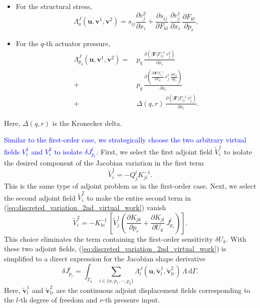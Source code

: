 \documentclass[journal]{IEEEtran}
\theoremstyle{definition}
\begin{document}
\begin{itemize}
  \item For the structural stress,
    \begin{equation}
      \Lambda^J_a\left(\mathbf{u},\mathbf{v}^1,\mathbf{v}^2\right) = s_{ij}\frac{\partial v^2_j}{\partial x_i} + \frac{\partial s_{ij}}{\partial F_{kl}}\,\frac{\partial v^1_j}{\partial x_i}\,\frac{\partial F_{kl}}{\partial p_r},
    \end{equation}
  \item For the $q$-th actuator pressure,
    \begin{equation}
      \begin{split}
        \Lambda^J_{p_q}\left(\mathbf{u},\mathbf{v}^1,\mathbf{v}^2\right) =\,
        &p_q\,\frac{\partial\left(\left|\mathbf{F}\right|F^{-1}_{ij}\,v^2_j\right)}{\partial x_i} \\
        +&p_q\,\frac{\partial\left(\frac{\partial\left|\mathbf{F}\right|F^{-1}_{ij}}{\partial F_{kl}}\,v^1_j\,\frac{\partial F_{kl}}{\partial p_r}\right)}{\partial x_i}\\[1mm]
        +&\Delta\left(q,r\right)\,\frac{\partial\left( \left|\mathbf{F}\right|F^{-1}_{ij}\,v^1_j\right)}{\partial x_i}.
      \end{split}
    \end{equation}
\end{itemize}
Here, $\Delta(q,r)$ is the Kronecker delta.

\textcolor{blue}{Similar to the first-order case, we strategically choose the two arbitrary virtual fields $V_i^1$ and $V_i^2$ to isolate $\delta J^l_{p_r}$.}
First, we select the first adjoint field $\tilde{V}_i^1$ to isolate the desired component of the Jacobian variation in the first term
\begin{equation}
  \tilde{V}_i^1 = -Q^l_j K^{-1}_{ji} .
  \label{eq:first_adjoint}
\end{equation}
This is the same type of adjoint problem as in the first-order case.
Next, we select the second adjoint field $\tilde{V}_i^2$ to make the entire second term in (\ref{eq:discreted_variation_2nd_virtual_work}) vanish
\begin{equation}
  \tilde{V}_i^2 = -K_{ki}^{-1}\,\left[ \tilde{V}_j^1\left(\frac{\partial K_{jk}}{\partial {p_r}} + \frac{\partial K_{jl}}{\partial U_k}\,J^l_{p_r}\right) \right].
  \label{eq:second_adjoint}
\end{equation}
This choice eliminates the term containing the first-order sensitivity $\delta U_k$. With these two adjoint fields, (\ref{eq:discreted_variation_2nd_virtual_work}) is simplified to a direct expression for the Jacobian shape derivative
\begin{equation}
  \delta J^l_{p_r} = \int_{\Gamma_0} \sum_{i\in\{a,p_1,\cdots,p_q\}} \Lambda_i^J\left(\mathbf{u},\tilde{\mathbf{v}}^1_l,\tilde{\mathbf{v}}^2_{lr}\right)\,\Lambda \,\mathrm{d}\Gamma.
  \label{eq:jacobian_shape_derivative}
\end{equation}
Here, $\tilde{\mathbf{v}}^1_l$ and $\tilde{\mathbf{v}}^2_{lr}$ are the continuous adjoint displacement fields corresponding to the $l$-th degree of freedom and $r$-th pressure input.
\end{document}
